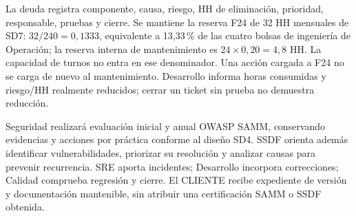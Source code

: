La deuda registra componente, causa, riesgo, HH de eliminación, prioridad, responsable, pruebas y cierre. Se mantiene la reserva F24 de 32 HH mensuales de SD7: $32/240=0,1333$, equivalente a 13,33\,\% de las cuatro bolsas de ingeniería de Operación; la reserva interna de mantenimiento es $24\times0,20=4,8$ HH. La capacidad de turnos no entra en ese denominador. Una acción cargada a F24 no se carga de nuevo al mantenimiento. Desarrollo informa horas consumidas y riesgo/HH realmente reducidos; cerrar un ticket sin prueba no demuestra reducción. \parencite[RT-21.21, p.~38]{sd6-bt}

Seguridad realizará evaluación inicial y anual OWASP SAMM, conservando evidencias y acciones por práctica conforme al diseño SD4. SSDF orienta además identificar vulnerabilidades, priorizar su resolución y analizar causas para prevenir recurrencia. SRE aporta incidentes; Desarrollo incorpora correcciones; Calidad comprueba regresión y cierre. El CLIENTE recibe expediente de versión y documentación mantenible, sin atribuir una certificación SAMM o SSDF obtenida. \parencites{sd6-samm}[RV.1--RV.3, tabla~1]{sd6-ssdf}
